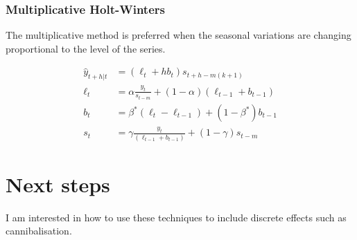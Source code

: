 \documentclass{article}
\begin{document}
\subsubsection{Multiplicative Holt-Winters} 
The multiplicative method is preferred when the seasonal variations are changing proportional to the level of the series. 

\begin{align*}
  \hat{y}_{t+h|t} & = (\ell_{t} + hb_{t})s_{t+h-m(k+1)} \\
  \ell_{t} & = \alpha \frac{y_{t}}{s_{t-m}} + (1 - \alpha)(\ell_{t-1} + b_{t-1})\\
  b_{t} & = \beta^*(\ell_{t}-\ell_{t-1}) + (1 - \beta^*)b_{t-1}                \\
  s_{t} & = \gamma \frac{y_{t}}{(\ell_{t-1} + b_{t-1})} + (1 - \gamma)s_{t-m}
\end{align*}

\section{Next steps}
I am interested in how to use these techniques to include discrete effects such as cannibalisation.
\end{document}

